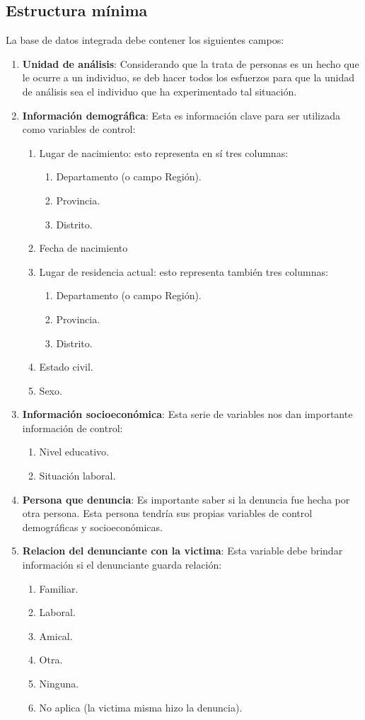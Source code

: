 \documentclass{article}
\begin{document}
\subsection{Estructura mínima}\label{minima}
La base de datos integrada debe contener los siguientes campos:
\begin{enumerate}
\item {\bf Unidad de análisis}: Considerando que la trata de personas es un hecho que le ocurre a un individuo, se deb hacer todos los esfuerzos para que la unidad de análisis sea el individuo que ha experimentado tal situación.
\item {\bf Información demográfica}: Esta es información clave para ser utilizada como variables de control:
\begin{enumerate}
\item Lugar de nacimiento: esto representa en sí tres columnas:
  \begin{enumerate}
  \item Departamento (o campo Región).
  \item Provincia.
  \item Distrito.
  \end{enumerate}
\item Fecha de nacimiento
\item Lugar de residencia actual: esto representa también tres columnas:
  \begin{enumerate}
  \item Departamento (o campo Región).
  \item Provincia.
  \item Distrito.
  \end{enumerate}
\item Estado civil.
\item Sexo.
\end{enumerate}
\item {\bf Información socioeconómica}: Esta serie de variables nos dan importante información de control:
  \begin{enumerate}
  \item Nivel educativo.
  \item Situación laboral.
  \end{enumerate}
\item {\bf Persona que denuncia}: Es importante saber si la denuncia fue hecha por otra persona. Esta persona tendría sus propias variables de control demográficas y socioeconómicas.
\item {\bf Relacion del denunciante con la victima}: Esta variable debe brindar información si el denunciante guarda relación:
\begin{enumerate}
\item Familiar.
\item Laboral.
\item Amical.
\item Otra.
\item Ninguna.
\item No aplica (la victima misma hizo la denuncia).
\end{enumerate}


\end{enumerate}
\end{document}
